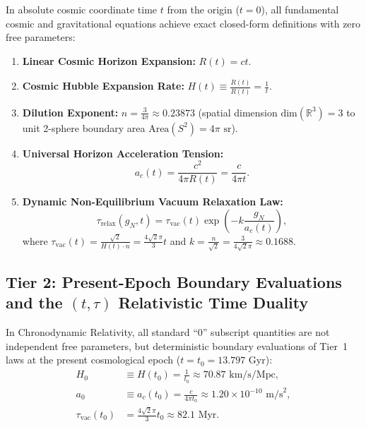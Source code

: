 \documentclass[aps,prd,reprint,superscriptaddress,nofootinbib,floatfix,amsmath,amssymb]{revtex4-2}
\begin{document}
In absolute cosmic coordinate time $t$ from the origin ($t=0$), all fundamental cosmic and gravitational equations achieve exact closed-form definitions with zero free parameters:
\begin{enumerate}
    \item \textbf{Linear Cosmic Horizon Expansion:} $R(t) = c t$.
    \item \textbf{Cosmic Hubble Expansion Rate:} $H(t) \equiv \frac{\dot{R}(t)}{R(t)} = \frac{1}{t}$.
    \item \textbf{Dilution Exponent:} $n = \frac{3}{4\pi} \approx 0.23873$ (spatial dimension $\text{dim}(\mathbb{R}^3) = 3$ to unit 2-sphere boundary area $\text{Area}(S^2) = 4\pi\text{ sr}$).
    \item \textbf{Universal Horizon Acceleration Tension:}
    \begin{equation}
    a_c(t) = \frac{c^2}{4\pi R(t)} = \frac{c}{4\pi t}.
    \label{eq:ac_t}
    \end{equation}
    \item \textbf{Dynamic Non-Equilibrium Vacuum Relaxation Law:}
    \begin{equation}
    \tau_{\text{relax}}(g_N, t) = \tau_{\text{vac}}(t) \exp\left(-k \frac{g_N}{a_c(t)}\right),
    \label{eq:tau_relax_law}
    \end{equation}
    where $\tau_{\text{vac}}(t) = \frac{\sqrt{2}}{H(t) \cdot n} = \frac{4\sqrt{2}\pi}{3} t$ and $k = \frac{n}{\sqrt{2}} = \frac{3}{4\sqrt{2}\pi} \approx 0.1688$.
\end{enumerate}

\subsection{Tier 2: Present-Epoch Boundary Evaluations and the \texorpdfstring{$(t, \tau)$}{(t, tau)} Relativistic Time Duality}
\label{sec:tier2_evaluations}

In Chronodynamic Relativity, all standard ``$0$'' subscript quantities are not independent free parameters, but deterministic boundary evaluations of Tier~1 laws at the present cosmological epoch ($t = t_0 = 13.797\text{ Gyr}$):
\begin{align}
H_0 &\equiv H(t_0) = \frac{1}{t_0} \approx 70.87\text{ km/s/Mpc}, \label{eq:eval_h0} \\
a_0 &\equiv a_c(t_0) = \frac{c}{4\pi t_0} \approx 1.20 \times 10^{-10}\text{ m/s}^2, \label{eq:eval_a0} \\
\tau_{\text{vac}}(t_0) &= \frac{4\sqrt{2}\pi}{3} t_0 \approx 82.1\text{ Myr}. \label{eq:eval_tauvac}
\end{align}
\end{document}
